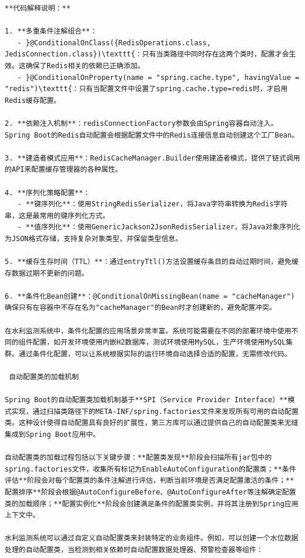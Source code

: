 \begin{lstlisting}
**代码解释说明：**

1. **多重条件注解组合**：
   - }@ConditionalOnClass({RedisOperations.class, JedisConnection.class})\texttt{：只有当类路径中同时存在这两个类时，配置才会生效。这确保了Redis相关的依赖已正确添加。
   - }@ConditionalOnProperty(name = "spring.cache.type", havingValue = "redis")\texttt{：只有当配置文件中设置了spring.cache.type=redis时，才启用Redis缓存配置。

2. **依赖注入机制**：redisConnectionFactory参数会由Spring容器自动注入。Spring Boot的Redis自动配置会根据配置文件中的Redis连接信息自动创建这个工厂Bean。

3. **建造者模式应用**：RedisCacheManager.Builder使用建造者模式，提供了链式调用的API来配置缓存管理器的各种属性。

4. **序列化策略配置**：
   - **键序列化**：使用StringRedisSerializer，将Java字符串转换为Redis字符串，这是最常用的键序列化方式。
   - **值序列化**：使用GenericJackson2JsonRedisSerializer，将Java对象序列化为JSON格式存储，支持复杂对象类型，并保留类型信息。

5. **缓存生存时间（TTL）**：通过entryTtl()方法设置缓存条目的自动过期时间，避免缓存数据过期不更新的问题。

6. **条件化Bean创建**：@ConditionalOnMissingBean(name = "cacheManager")确保只有在容器中不存在名为"cacheManager"的Bean时才创建新的，避免配置冲突。

在水利监测系统中，条件化配置的应用场景非常丰富。系统可能需要在不同的部署环境中使用不同的组件配置，如开发环境使用内嵌H2数据库，测试环境使用MySQL，生产环境使用MySQL集群。通过条件化配置，可以让系统根据实际的运行环境自动选择合适的配置，无需修改代码。

 自动配置类的加载机制

Spring Boot的自动配置类加载机制基于**SPI（Service Provider Interface）**模式实现，通过扫描类路径下的META-INF/spring.factories文件来发现所有可用的自动配置类。这种设计使得自动配置具有良好的扩展性，第三方库可以通过提供自己的自动配置类来无缝集成到Spring Boot应用中。

自动配置类的加载过程包括以下关键步骤：**配置类发现**阶段会扫描所有jar包中的spring.factories文件，收集所有标记为EnableAutoConfiguration的配置类；**条件评估**阶段会对每个配置类的条件注解进行评估，判断当前环境是否满足配置激活的条件；**配置排序**阶段会根据@AutoConfigureBefore、@AutoConfigureAfter等注解确定配置类的加载顺序；**配置实例化**阶段会创建满足条件的配置类实例，并将其注册到Spring应用上下文中。

水利监测系统可以通过自定义自动配置类来封装特定的业务组件。例如，可以创建一个水位数据处理的自动配置类，当检测到相关依赖时自动配置数据处理器、预警检查器等组件：
\end{lstlisting}

